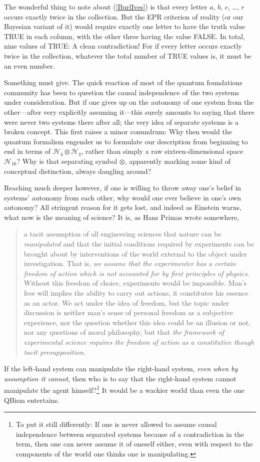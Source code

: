 The wonderful thing to note about (\ref{BurlIves}) is that every letter $a$, $b$, $c$, \ldots, $r$ occurs exactly twice in the collection.  But the EPR criterion of reality (or our Bayesian variant of it) would require exactly one letter to have the truth value TRUE in each column, with the other three having the value FALSE.  In total, nine values of TRUE:  A clean contradiction!  For if every letter occurs exactly twice in the collection, whatever the total number of TRUE values is, it must be an even number.

Something must give.  The quick reaction of most of the quantum foundations community has been to question the causal independence of the two systems under consideration.  But if one gives up on the autonomy of one system from the other---after very explicitly assuming it---this surely amounts to saying that there were never two systems there after all; the very idea of separate systems is a broken concept.  This first raises a minor conundrum:  Why then would the quantum formalism engender us to formulate our description from beginning to end in terms of ${\mathcal H}_4\otimes{\mathcal H}_4$, rather than simply a raw sixteen-dimensional space ${\mathcal H}_{16}$?  Why is that separating symbol $\otimes$, apparently marking some kind of conceptual distinction, always dangling around?

Reaching much deeper however, if one is willing to throw away one's belief in systems' autonomy from each other, why would one ever believe in one's own autonomy?  All stringent reason for it gets lost, and indeed as Einstein warns, what now is the meaning of science?  It is, as Hans Primas wrote somewhere,
\begin{quotation}\small
\noindent a tacit assumption of all engineering sciences that nature can be {\it manipulated\/} and that the initial conditions required by experiments can be brought about by interventions of the world external to the object under investigation.  That is, {\it we assume that the experimenter has a certain freedom of action which is not accounted for by first principles of physics}.  Without this freedom of choice, experiments would be impossible.  Man's free will implies the ability to carry out actions, it constitutes his essence as an actor.  We act under the idea of freedom, but the topic under discussion is neither man's sense of personal freedom as a subjective experience, nor the question whether this idea could be an illusion or not, nor any questions of moral philosophy, but that {\it the framework of experimental science requires the freedom of action as a constitutive though tacit presupposition}.
\end{quotation}
If the left-hand system can manipulate the right-hand system, {\it even when by assumption it cannot}, then who is to say that the right-hand system cannot manipulate the agent himself?\footnote{To put it still differently:  If one is never allowed to assume causal independence between separated systems because of a contradiction in the term, then one can never assume it of oneself either, even with respect to the components of the world one thinks one is manipulating.}  It would be a wackier world than even the one QBism entertains.

